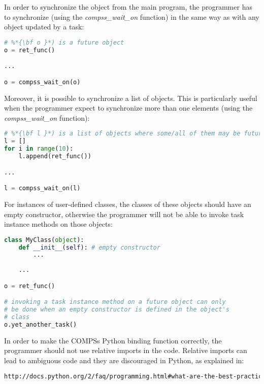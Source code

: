 In order to synchronize the object from the main program, the programmer has to synchronize (using the \textit{compss\_wait\_on} function) in the same way 
as with any object updated by a task:

\begin{lstlisting}[language=python]
# %*{\bf o }*) is a future object
o = ret_func()

...

o = compss_wait_on(o)
\end{lstlisting}
                         
Moreover, it is possible to synchronize a list of objects. This is particularly useful when the programmer expect to synchronize more 
than one elements (using the \textit{compss\_wait\_on} function):

\begin{lstlisting}[language=python]
# %*{\bf l }*) is a list of objects where some/all of them may be future objects
l = []
for i in range(10):
    l.append(ret_func())

...

l = compss_wait_on(l)
\end{lstlisting}
                         
                         
For instances of user-defined classes, the classes of these objects 
should have an empty constructor, otherwise the programmer will not be able to invoke task instance 
methods on those objects:
                                   
\begin{lstlisting}[language=python]
class MyClass(object):
    def __init__(self): # empty constructor
        ...
        
    ...

o = ret_func()

# invoking a task instance method on a future object can only
# be done when an empty constructor is defined in the object's
# class
o.yet_another_task()
\end{lstlisting}

In order to make the COMPSs Python binding function correctly, the programmer should not use relative imports in the code.
Relative imports can lead to ambiguous code and they are discouraged in Python, as explained in:

\begin{lstlisting}[language=html]
http://docs.python.org/2/faq/programming.html#what-are-the-best-practices-for-using-import-in-a-module
\end{lstlisting}



